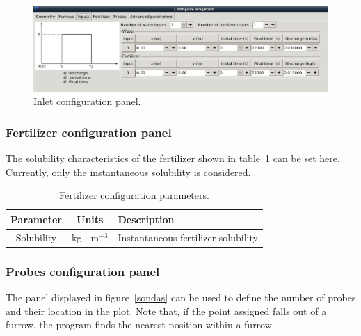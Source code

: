 \documentclass[review,authoryear]{elsarticle}
\begin{document}
\begin{figure}[!ht]
\begin{center}
\includegraphics[width=993\UNIT]{confInputEN-2.eps}
\caption{Inlet configuration panel.}\label{input}
\end{center}
\end{figure}

\subsubsection{Fertilizer configuration panel}

The solubility characteristics of the fertilizer shown in
table~\ref{tabFertilizer} can be set here. Currently, only the instantaneous
solubility is considered.

\begin{table}[!ht]\footnotesize
\centering
\caption{Fertilizer configuration parameters.}\label{tabFertilizer}
\begin{tabular}{ccl}
\hline
Parameter & Units & Description \\
\hline
Solubility & kg $\cdot$ m$^{-3}$ & Instantaneous fertilizer solubility \\ 
\hline
\end{tabular}
\end{table}

\subsubsection{Probes configuration panel}

The panel displayed in figure~\ref{sondas} can be used to define the number of
probes and their location in the plot. Note that, if the point assigned falls
out of a furrow, the program finds the nearest position within a furrow.
\end{document}

